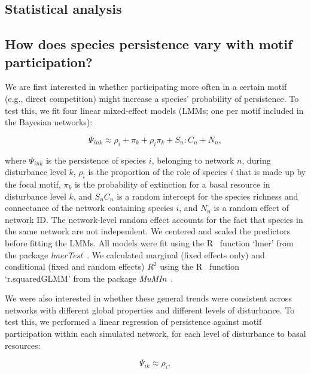 \documentclass[12pt]{article}
\begin{document}
\begin{spacing}{2.0}
\section{Statistical analysis}

    \subsection{How does species persistence vary with motif participation?}

        We are first interested in whether participating more often in a certain motif (e.g., direct competition) might increase a species' probability of persistence.
        To test this, we fit four linear mixed-effect models (LMMs; one per motif included in the Bayesian networks):

        \begin{equation}
            \Psi_{ink} \approx \rho_{i} + \pi_{k} + \rho_{i}\pi_{k} +
            S_{n}:C_{n} + N_n,
            \label{propreq}
        \end{equation}


        \noindent where $\Psi_{ink}$ is the persistence of species $i$, belonging to network $n$, during disturbance level $k$, $\rho_{i}$ is the proportion of the role of species $i$ that is made up by the focal motif, $\pi_{k}$ is the probability of extinction for a basal resource in disturbance level $k$, and $S_{n}C_{n}$ is a random intercept for the species richness and connectance of the network containing species $i$, and $N_n$ is a random effect of network ID.
        The network-level random effect accounts for the fact that species in the same network are not independent.
        We centered and scaled the predictors before fitting the LMMs.
        All models were fit using the R~\citep{R} function `lmer' from the package \emph{lmerTest}~\citep{lmerTest}.
        We calculated marginal (fixed effects only) and conditional (fixed and random effects) $R^2$ using the R~\citep{R} function `r.squaredGLMM' from the package \emph{MuMIn}~\citep{MuMIn}.

        
        We were also interested in whether these general trends were consistent across networks with different global properties and different levels of disturbance. 
        To test this, we performed a linear regression of persistence against motif participation within each simulated network, for each level of disturbance to basal resources:

        \begin{equation}
            \Psi_{ik} \approx \rho_{i} ,
            \label{mineq}
        \end{equation}


\end{spacing}
\end{document}
